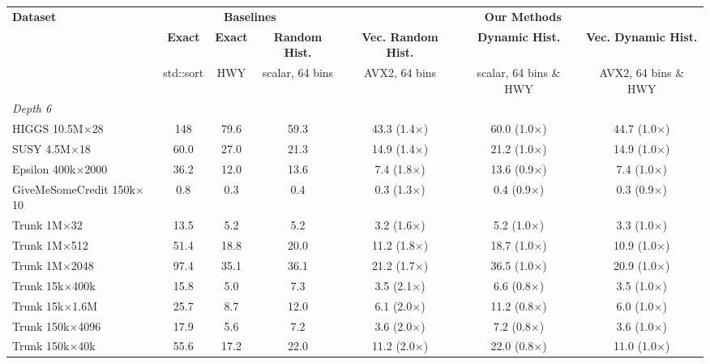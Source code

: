 \begin{table}[p]
    \centering
    \footnotesize
    \setlength{\tabcolsep}{4pt}
    \begin{tabular}{l|ccc|ccc}
        \hline
        \multirow{3}{*}{\textbf{Dataset}} & \multicolumn{3}{c|}{\textbf{Baselines}} & \multicolumn{3}{c}{\textbf{Our Methods}} \\
         & \textbf{Exact} & \textbf{Exact} & \textbf{Random Hist.} & \textbf{Vec. Random Hist.} & \textbf{Dynamic Hist.} & \textbf{Vec. Dynamic Hist.} \\
         & \scriptsize std::sort & \scriptsize HWY & \scriptsize scalar, 64 bins & \scriptsize AVX2, 64 bins & \scriptsize scalar, 64 bins \& HWY & \scriptsize AVX2, 64 bins \& HWY \\
        \hline
        \multicolumn{7}{l}{\textit{Depth 6}} \\
        HIGGS 10.5M$\times$28 & 148 & 79.6 & 59.3 & 43.3 (1.4$\times$) & 60.0 (1.0$\times$) & 44.7 (1.0$\times$) \\
        SUSY 4.5M$\times$18 & 60.0 & 27.0 & 21.3 & 14.9 (1.4$\times$) & 21.2 (1.0$\times$) & 14.9 (1.0$\times$) \\
        Epsilon 400k$\times$2000 & 36.2 & 12.0 & 13.6 & 7.4 (1.8$\times$) & 13.6 (0.9$\times$) & 7.4 (1.0$\times$) \\
        GiveMeSomeCredit 150k$\times$10 & 0.8 & 0.3 & 0.4 & 0.3 (1.3$\times$) & 0.4 (0.9$\times$) & 0.3 (0.9$\times$) \\
        Trunk 1M$\times$32 & 13.5 & 5.2 & 5.2 & 3.2 (1.6$\times$) & 5.2 (1.0$\times$) & 3.3 (1.0$\times$) \\
        Trunk 1M$\times$512 & 51.4 & 18.8 & 20.0 & 11.2 (1.8$\times$) & 18.7 (1.0$\times$) & 10.9 (1.0$\times$) \\
        Trunk 1M$\times$2048 & 97.4 & 35.1 & 36.1 & 21.2 (1.7$\times$) & 36.5 (1.0$\times$) & 20.9 (1.0$\times$) \\
        Trunk 15k$\times$400k & 15.8 & 5.0 & 7.3 & 3.5 (2.1$\times$) & 6.6 (0.8$\times$) & 3.5 (1.0$\times$) \\
        Trunk 15k$\times$1.6M & 25.7 & 8.7 & 12.0 & 6.1 (2.0$\times$) & 11.2 (0.8$\times$) & 6.0 (1.0$\times$) \\
        Trunk 150k$\times$4096 & 17.9 & 5.6 & 7.2 & 3.6 (2.0$\times$) & 7.2 (0.8$\times$) & 3.6 (1.0$\times$) \\
        Trunk 150k$\times$40k & 55.6 & 17.2 & 22.0 & 11.2 (2.0$\times$) & 22.0 (0.8$\times$) & 11.0 (1.0$\times$) \\

\end{tabular}
\end{table}
